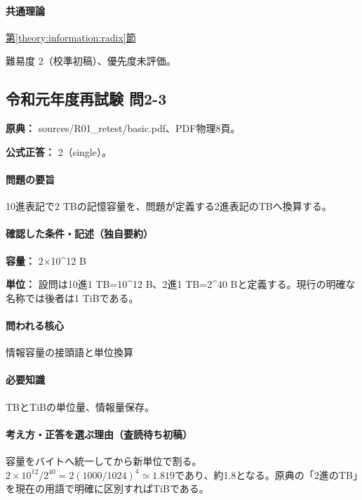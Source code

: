\paragraph{共通理論} \hyperref[theory:information:radix]{第\ref*{theory:information:radix}節}

\par 難易度 2（校準初稿）、優先度未評価。

\subsection{令和元年度再試験 問2-3}
\label{q:r01-ret-basic-2-3}

\noindent\textbf{原典：} sources/R01\_retest/basic.pdf、PDF物理8頁。

\textbf{公式正答：} 2（single）。

\paragraph{問題の要旨} 10進表記で2 TBの記憶容量を、問題が定義する2進表記のTBへ換算する。

\paragraph{確認した条件・記述（独自要約）}\mbox{}\par

\noindent\textbf{容量：} 2×10\textasciicircum{}12 B\par

\noindent\textbf{単位：} 設問は10進1 TB=\allowbreak{}10\textasciicircum{}12 B、2進1 TB=\allowbreak{}2\textasciicircum{}40 Bと定義する。現行の明確な名称では後者は1 TiBである。\par

\paragraph{問われる核心} 情報容量の接頭語と単位換算

\paragraph{必要知識} TBとTiBの単位量、情報量保存。

\paragraph{考え方・正答を選ぶ理由（査読待ち初稿）} 容量をバイトへ統一してから新単位で割る。\(2\times10^{12}/2^{40}=2(1000/1024)^4\simeq1.819\)であり、約1.8となる。原典の「2進のTB」を現在の用語で明確に区別すればTiBである。

